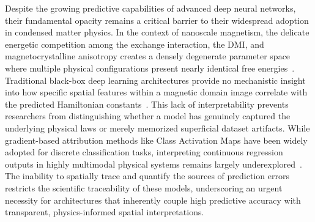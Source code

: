 \documentclass[a4paper,fleqn]{cas-sc}
\begin{document}
Despite the growing predictive capabilities of advanced deep neural networks, their fundamental opacity remains a critical barrier to their widespread adoption in condensed matter physics. In the context of nanoscale magnetism, the delicate energetic competition among the exchange interaction, the DMI, and magnetocrystalline anisotropy creates a densely degenerate parameter space where multiple physical configurations present nearly identical free energies~\cite{vcadevz2026neural, will2021application}. Traditional black-box deep learning architectures provide no mechanistic insight into how specific spatial features within a magnetic domain image correlate with the predicted Hamiltonian constants~\cite{wang2021learning, sridharan2022modern}. This lack of interpretability prevents researchers from distinguishing whether a model has genuinely captured the underlying physical laws or merely memorized superficial dataset artifacts. While gradient-based attribution methods like Class Activation Maps have been widely adopted for discrete classification tasks, interpreting continuous regression outputs in highly multimodal physical systems remains largely underexplored~\cite{he2022survey}. The inability to spatially trace and quantify the sources of prediction errors restricts the scientific traceability of these models, underscoring an urgent necessity for architectures that inherently couple high predictive accuracy with transparent, physics-informed spatial interpretations.
\end{document}
